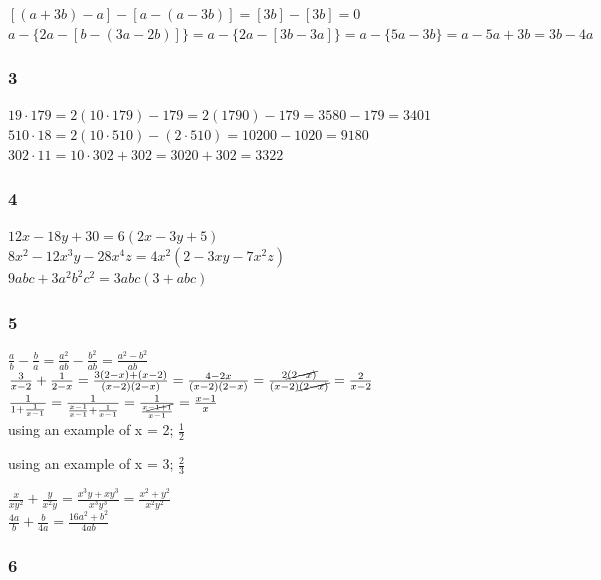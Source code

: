 \documentclass[]{report}
\begin{document}
$ [(a + 3b) -a] - [a - (a - 3b)] =  [3b] -  [3b] = 0 $ \\



$ a - \{2a - [b - (3a - 2b)]\} = a  - \{2a - [3b - 3a]\} = a  - \{5a - 3b\} = a - 5a + 3b = 3b - 4a $

\subsubsection{3}
$ 19 \cdot 179 = 2(10 \cdot 179) - 179 = 2(1790) - 179 = 3580 - 179 = 3401 $ \\
$ 510 \cdot 18 = 2(10 \cdot 510) - (2 \cdot 510) = 10200 - 1020 = 9180 $ \\
$ 302 \cdot 11 = 10\cdot 302 + 302 = 3020 + 302 = 3322 $ \\

\subsubsection{4}

$ 12x - 18y + 30 = 6(2x - 3y + 5)$ \\
$ 8x^2 - 12x^3y - 28x^4z = 4x^2(2 - 3xy -7x^2z)$ \\
$ 9abc + 3a^2b^2c^2 = 3abc(3 + abc) $

\subsubsection{5}

$ \frac{a}{b} - \frac{b}{a} = \frac{a^2}{ab} - \frac{b^2}{ab} = \frac{a^2-b^2}{ab} $\\
$\frac{3}{x - 2}  + \frac{1}{2-x} = \frac{3(2-x) + (x-2)}{(x-2)(2-x)} = \frac{4 - 2x}{(x-2)(2-x)} =\frac{2\cancel{(2 - x)}}{(x-2)\cancel{(2-x)}} = \frac{2}{x-2}$\\


$\frac{1}{1 + \frac{1}{x-1}} = \frac{1}{\frac{x-1}{x-1} + \frac{1}{x-1}} = \frac{1}{\frac{x\cancel{-1+1}}{x-1}} = \frac{x-1}{x}$ \\

using an example of x = 2;
$\frac{1}{2} $ 

using an example of x = 3;
$\frac{2}{3} $ 



$\frac{x}{xy^2} + \frac{y}{x^2y} = \frac{x^3y + xy^3}{x^3y^3} = \frac{x^2 + y^2}{x^2y^2}$ \\
$\frac{4a}{b} + \frac{b}{4a} = \frac{16a^2 + b^2}{4ab}$

\subsubsection{6}
\end{document}
